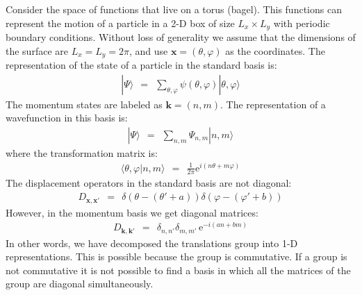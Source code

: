 \documentclass[onecolumn,fleqn]{revtex4}
\newcommand{\eexp}{\mathrm{e}^}
\newcommand{\beq}{\begin{eqnarray}}
\newcommand{\eeq}{\end{eqnarray}}
\begin{document}
Consider the space of functions that live on a torus (bagel).
This functions can represent the motion  
of a particle in a 2-D box of size ${L_x \times L_y}$  
with periodic boundary conditions. 
Without loss of generality we assume that 
the dimensions of the surface are ${L_x=L_y=2\pi}$, 
and use ${\bm{x}=(\theta,\varphi)}$ as the coordinates.  
The representation of the state of a particle 
in the standard basis is:
\beq
|\Psi \rangle \ \ = \ \ \sum_{\theta,\varphi} \psi(\theta,\varphi) |\theta,\varphi\rangle 
\eeq
The momentum states are labeled as $\bm{k}=(n,m)$. 
The representation of a wavefunction in this basis is:
\beq
|\Psi \rangle \ \ = \ \ \sum_{n,m} \Psi_{n,m} |n,m\rangle 
\eeq
where the transformation matrix is:
\beq
\langle \theta,\varphi |n,m\rangle \ \ = \ \ \frac{1}{2\pi}\eexp{i (n\theta  + m \varphi)} 
\eeq
The displacement operators in the standard basis are not diagonal:
\beq
D_{\bm{x},\bm{x}'} \ \ = \ \ 
\delta (\theta-(\theta'+a))\delta(\varphi-(\varphi'+b)) 
\eeq
However, in the momentum basis we get diagonal matrices:
\beq
D_{\bm{k},\bm{k}'} \ \ = \ \  
\delta_{n,n'} \delta_{m,m'} \, \eexp{-i(a n + b m)} 
\eeq
In other words, we have decomposed the translations 
group into 1-D representations. This is possible 
because the group is commutative. If a group is 
not commutative it is not possible to find a basis 
in which all the matrices of the group are diagonal 
simultaneously. 
\end{document}
